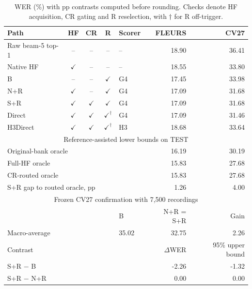 \begin{table}[H]\centering\footnotesize
\caption{WER (\%) with pp contrasts computed before rounding. Checks denote HF acquisition, CR gating and R reselection, with $\dagger$ for R off-trigger.}\label{tab:paths}
\setlength{\tabcolsep}{3pt}\renewcommand{\arraystretch}{1.00}
\begin{tabular}{@{}lccclrr@{}}\toprule
Path & HF & CR & R & Scorer & FLEURS & CV27\\\midrule
Raw beam-5 top-1 & -- & -- & -- & -- & 18.90 & 36.41\\
Native HF & $\checkmark$ & -- & -- & -- & 18.55 & 33.80\\
B & -- & -- & $\checkmark$ & G4 & 17.45 & 33.98\\
N+R & $\checkmark$ & -- & $\checkmark$ & G4 & 17.09 & 31.68\\
S+R & $\checkmark$ & $\checkmark$ & $\checkmark$ & G4 & 17.09 & 31.68\\
Direct & $\checkmark$ & $\checkmark$ & $\checkmark^{\dagger}$ & G4 & 17.09 & 31.46\\
H3Direct & $\checkmark$ & $\checkmark$ & $\checkmark^{\dagger}$ & H3 & 18.68 & 33.64\\
\midrule\multicolumn{7}{c}{Reference-assisted lower bounds on TEST}\\
\multicolumn{5}{l}{Original-bank oracle} & 16.19 & 30.19\\
\multicolumn{5}{l}{Full-HF oracle} & 15.83 & 27.68\\
\multicolumn{5}{l}{CR-routed oracle} & 15.83 & 27.68\\
\multicolumn{5}{l}{S+R gap to routed oracle, pp} & 1.26 & 4.00\\
\midrule\multicolumn{7}{c}{Frozen CV27 confirmation with 7,500 recordings}\\
\multicolumn{4}{l}{} & B & N+R = S+R & Gain\\\midrule
\multicolumn{4}{l}{Macro-average} & 35.02 & 32.75 & 2.26\\
\midrule\multicolumn{5}{l}{Contrast} & $\Delta$WER & 95\% upper bound\\
\multicolumn{5}{l}{S+R $-$ B} & -2.26 & -1.32\\
\multicolumn{5}{l}{S+R $-$ N+R} & 0.00 & 0.00\\
\bottomrule\end{tabular}\end{table}
